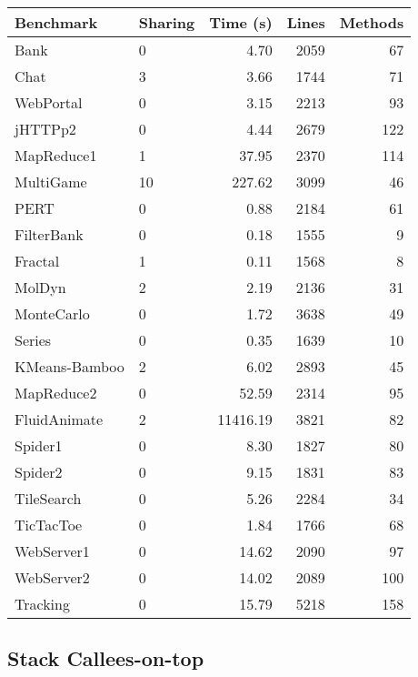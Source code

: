 \documentclass{amsart}[9pt]
\begin{document}
\begin{tabular}{|l|l|r|r|r|}
\hline
Benchmark & Sharing & Time (s) & Lines & Methods \\
\hline
Bank & 0 & 4.70 & 2059 & 67 \\
Chat & 3 & 3.66 & 1744 & 71 \\
WebPortal & 0 & 3.15 & 2213 & 93 \\
jHTTPp2 & 0 & 4.44 & 2679 & 122 \\
MapReduce1 & 1 & 37.95 & 2370 & 114 \\
MultiGame & 10 & 227.62 & 3099 & 46 \\
PERT & 0 & 0.88 & 2184 & 61 \\
FilterBank & 0 & 0.18 & 1555 & 9 \\
Fractal & 1 & 0.11 & 1568 & 8 \\
MolDyn & 2 & 2.19 & 2136 & 31 \\
MonteCarlo & 0 & 1.72 & 3638 & 49 \\
Series & 0 & 0.35 & 1639 & 10 \\
KMeans-Bamboo & 2 & 6.02 & 2893 & 45 \\
MapReduce2 & 0 & 52.59 & 2314 & 95 \\
FluidAnimate & 2 & 11416.19 & 3821 & 82 \\
Spider1 & 0 & 8.30 & 1827 & 80 \\
Spider2 & 0 & 9.15 & 1831 & 83 \\
TileSearch & 0 & 5.26 & 2284 & 34 \\
TicTacToe & 0 & 1.84 & 1766 & 68 \\
WebServer1 & 0 & 14.62 & 2090 & 97 \\
WebServer2 & 0 & 14.02 & 2089 & 100 \\
Tracking & 0 & 15.79 & 5218 & 158 \\
\hline
\end{tabular}



\subsection{Stack Callees-on-top}
\end{document}
